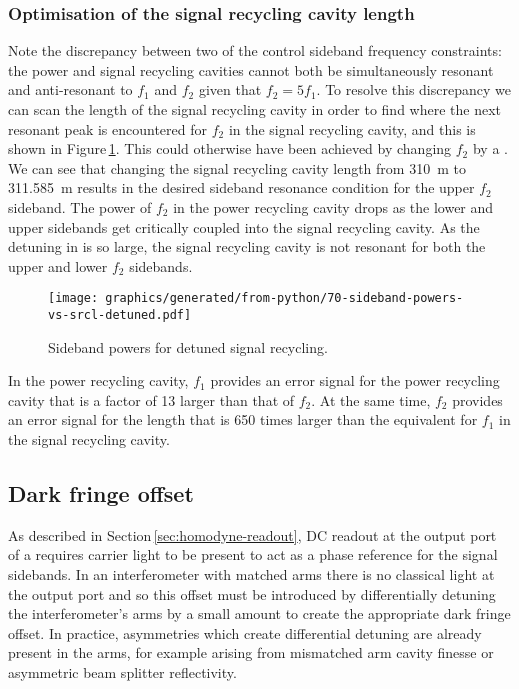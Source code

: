 \subsubsection{Optimisation of the signal recycling cavity length}
Note the discrepancy between two of the control sideband frequency constraints: the power and signal recycling cavities cannot both be simultaneously resonant and anti-resonant to $f_1$ and $f_2$ given that $f_2 = 5 f_1$. To resolve this discrepancy we can scan the length of the signal recycling cavity in order to find where the next resonant peak is encountered for $f_2$ in the signal recycling cavity, and this is shown in Figure\,\ref{fig:sideband-powers-srcl-detuned}. This could otherwise have been achieved by changing $f_2$ by a . We can see that changing the signal recycling cavity length from \SI{310}{\meter} to \SI{311.585}{\meter} results in the desired sideband resonance condition for the upper $f_2$ sideband. The power of $f_2$ in the power recycling cavity drops as the lower and upper sidebands get critically coupled into the signal recycling cavity. As the detuning in \ETLF{} is so large, the signal recycling cavity is not resonant for both the upper and lower $f_2$ sidebands.

\begin{figure}
  \centering
  \texttt{[image: graphics/generated/from-python/70-sideband-powers-vs-srcl-detuned.pdf]}
  \caption[Power of the control sidebands in the signal recycling cavity as a function of length of \ETLF{} in the detuned configuration]{\label{fig:sideband-powers-srcl-detuned}Sideband powers for detuned signal recycling.}
\end{figure}

In the power recycling cavity, $f_1$ provides an error signal for the power recycling cavity that is a factor of \num{13} larger than that of $f_2$. At the same time, $f_2$ provides an error signal for the length that is \num{650} times larger than the equivalent for $f_1$ in the signal recycling cavity.

\subsection{Dark fringe offset}
As described in Section\,\ref{sec:homodyne-readout}, \gls{DC} readout at the output port of a \DRFPMI{} requires carrier light to be present to act as a phase reference for the signal sidebands. In an interferometer with matched arms there is no classical light at the output port and so this offset must be introduced by differentially detuning the interferometer's arms by a small amount to create the appropriate dark fringe offset. In practice, asymmetries which create differential detuning are already present in the arms, for example arising from mismatched arm cavity finesse or asymmetric beam splitter reflectivity.


